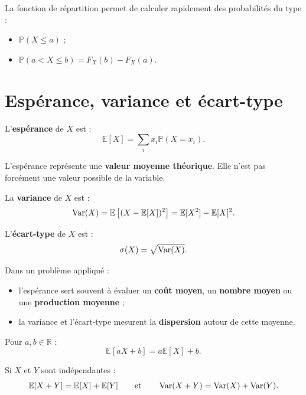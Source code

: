 \begin{Rmq}
La fonction de répartition permet de calculer rapidement des probabilités du type :
\begin{itemize}
    \item $\mathbb{P}(X\leq a)$ ;
    \item $\mathbb{P}(a<X\leq b)=F_X(b)-F_X(a)$.
\end{itemize}
\end{Rmq}

\section{Espérance, variance et écart-type}

\begin{Def}
L'\textbf{espérance} de $X$ est :
$$
\mathbb{E}[X]=\sum_i x_i \mathbb{P}(X=x_i).
$$
\end{Def}

\begin{Rmq}
L'espérance représente une \textbf{valeur moyenne théorique}. Elle n'est pas forcément une valeur possible de la variable.
\end{Rmq}

\begin{Def}
La \textbf{variance} de $X$ est :
$$
\operatorname{Var}(X)=\mathbb{E}\left[(X-\mathbb{E}[X])^2\right]
=\mathbb{E}[X^2]-\mathbb{E}[X]^2.
$$
\end{Def}

\begin{Def}
L'\textbf{écart-type} de $X$ est :
$$
\sigma(X)=\sqrt{\operatorname{Var}(X)}.
$$
\end{Def}

\begin{Meth}
Dans un problème appliqué :
\begin{itemize}
    \item l'espérance sert souvent à évaluer un \textbf{coût moyen}, un \textbf{nombre moyen} ou une \textbf{production moyenne} ;
    \item la variance et l'écart-type mesurent la \textbf{dispersion} autour de cette moyenne.
\end{itemize}
\end{Meth}

\begin{Prop}
Pour $a,b\in \mathbb{R}$ :
$$
\mathbb{E}[aX+b]=a\mathbb{E}[X]+b.
$$
\end{Prop}

\begin{Prop}
Si $X$ et $Y$ sont indépendantes :
$$
\mathbb{E}[X+Y]=\mathbb{E}[X]+\mathbb{E}[Y]
\qquad \text{et} \qquad
\operatorname{Var}(X+Y)=\operatorname{Var}(X)+\operatorname{Var}(Y).
$$
\end{Prop}

